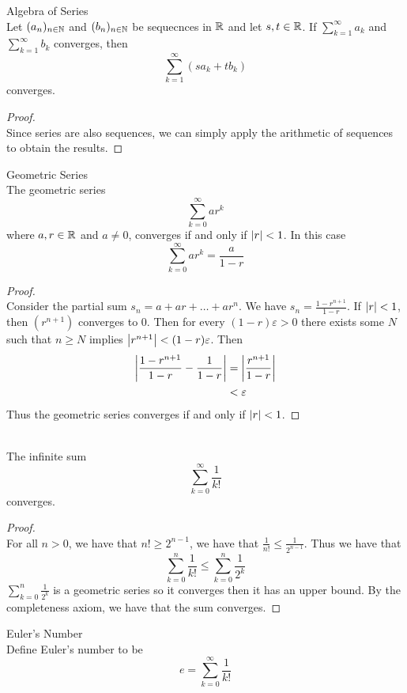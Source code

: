 \documentclass[a4paper]{article}
\begin{document}
\begin{thm}{Algebra of Series}{}\\ Let $(a_n)_{n\in\mathbb{N}}$ and $(b_n)_{n\in\mathbb{N}}$ be sequecnces in $\mathbb{R}$ and let $s,t\in\mathbb{R}$. If $\sum_{k=1}^\infty a_k$ and $\sum_{k=1}^\infty b_k$ converges, then $$\sum_{k=1}^\infty(sa_k+tb_k)$$ converges. 
\begin{proof}\\ Since series are also sequences, we can simply apply the arithmetic of sequences to obtain the results. 
\end{proof}
\end{thm}

\begin{thm}{Geometric Series}{}\\ The geometric series $$\sum_{k=0}^{\infty}ar^k$$ where $a,r\in\mathbb{R}$ and $a\neq0$, converges if and only if $\abs{r}<1$. In this case $$\sum_{k=0}^{\infty}ar^k=\frac{a}{1-r}$$ 
\begin{proof}\\ Consider the partial sum $s_n=a+ar+\dots+ar^{n}$. We have $s_n=\frac{1-r^{n+1}}{1-r}$. If $\abs{r}<1$, then $(r^{n+1})$ converges to $0$. Then for every $(1-r)\varepsilon>0$ there exists some $N$ such that $n\geq N$ implies $\abs{r^{n+1}}<(1-r)\varepsilon$. Then
\begin{align*}
\abs{\frac{1-r^{n+1}}{1-r}-\frac{1}{1-r}}&=\abs{\frac{r^{n+1}}{1-r}}\\
&<\varepsilon
\end{align*} Thus the geometric series converges if and only if $\abs{r}<1$. 
\end{proof}
\end{thm}

\begin{crl}{}{}\\ The infinite sum $$\sum_{k=0}^{\infty}\frac{1}{k!}$$ converges. 
\begin{proof}\\  For all $n>0$, we have that $n!\geq2^{n-1}$, we have that $\frac{1}{n!}\leq\frac{1}{2^{n-1}}$. Thus we have that $$\sum_{k=0}^{n}\frac{1}{k!}\leq\sum_{k=0}^{n}\frac{1}{2^{k}}$$ $\sum_{k=0}^{n}\frac{1}{2^{k}}$ is a geometric series so it converges then it has an upper bound. By the completeness axiom, we have that the sum converges. 
\end{proof}
\end{crl}

\begin{defn}{Euler's Number}{}\\ Define Euler's number to be $$e=\sum_{k=0}^{\infty}\frac{1}{k!}$$
\end{defn}
\end{document}
